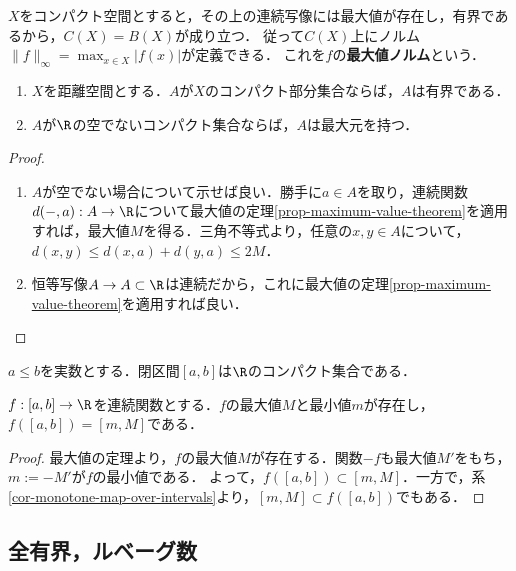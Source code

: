 \documentclass[uplatex,dvipdfmx]{jsreport}
\begin{document}
\begin{definition}
    $X$をコンパクト空間とすると，その上の連続写像には最大値が存在し，有界であるから，$C(X)=B(X)$が成り立つ．
    従って$C(X)$上にノルム$\|f\|_\infty=\max_{x\in X}|f(x)|$が定義できる．
    これを$f$の\textbf{最大値ノルム}という．
\end{definition}

\begin{corollary}[距離空間のコンパクト集合]\label{cor-compact-sets-in-metric-space-is-bounded}\mbox{}
    \begin{enumerate}
        \item $X$を距離空間とする．$A$が$X$のコンパクト部分集合ならば，$A$は有界である．
        \item $A$が$\R$の空でないコンパクト集合ならば，$A$は最大元を持つ．
    \end{enumerate}
\end{corollary}
\begin{proof}\mbox{}
    \begin{enumerate}
        \item $A$が空でない場合について示せば良い．勝手に$a\in A$を取り，連続関数$d(-,a):A\to\R$について最大値の定理\ref{prop-maximum-value-theorem}を適用すれば，最大値$M$を得る．三角不等式より，任意の$x,y\in A$について，$d(x,y)\le d(x,a)+d(y,a)\le 2M$．
        \item 恒等写像$A\to A\subset\R$は連続だから，これに最大値の定理\ref{prop-maximum-value-theorem}を適用すれば良い．
    \end{enumerate}
\end{proof}

\begin{theorem}\label{thm-Heine-Borel}
    $a\le b$を実数とする．閉区間$[a,b]$は$\R$のコンパクト集合である．
\end{theorem}

\begin{corollary}
    $f:[a,b]\to\R$を連続関数とする．$f$の最大値$M$と最小値$m$が存在し，$f([a,b])=[m,M]$である．
\end{corollary}
\begin{proof}
    最大値の定理より，$f$の最大値$M$が存在する．関数$-f$も最大値$M'$をもち，$m:=-M'$が$f$の最小値である．
    よって，$f([a,b])\subset[m,M]$．一方で，系\ref{cor-monotone-map-over-intervals}より，$[m,M]\subset f([a,b])$でもある．
\end{proof}

\subsection{全有界，ルベーグ数}
\end{document}
